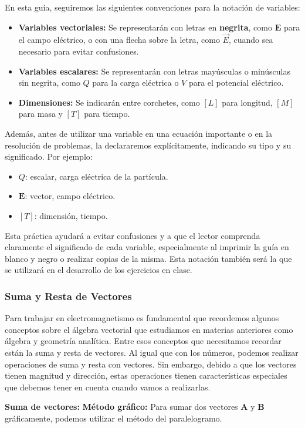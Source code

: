 \documentclass{article}
\begin{document}
En esta guía, seguiremos las siguientes convenciones para la notación de variables:
\begin{itemize}
\item[\textbullet] \textbf{Variables vectoriales:} Se representarán con letras en \textbf{negrita}, como $\mathbf{E}$ para el campo eléctrico, o con una flecha sobre la letra, como $\vec{E}$, cuando sea necesario para evitar confusiones.
\item[\textbullet] \textbf{Variables escalares:} Se representarán con letras mayúsculas o minúsculas sin negrita, como $Q$ para la carga eléctrica o $V$ para el potencial eléctrico.
\item[\textbullet] \textbf{Dimensiones:} Se indicarán entre corchetes, como $[L]$ para longitud, $[M]$ para masa y $[T]$ para tiempo.
\end{itemize}
Además, antes de utilizar una variable en una ecuación importante o en la resolución de problemas, la declararemos explícitamente, indicando su tipo y su significado. Por ejemplo:
\begin{itemize}
\item[\textbullet] $Q$: escalar, carga eléctrica de la partícula.
\item[\textbullet] $\mathbf{E}$: vector, campo eléctrico.
\item[\textbullet] $[T]$: dimensión, tiempo.
\end{itemize}
Esta práctica ayudará a evitar confusiones y a que el lector comprenda claramente el significado de cada variable, especialmente al imprimir la guía en blanco y negro o realizar copias de la misma. Esta notación también será la que se utilizará en el desarrollo de los ejercicios en clase.

\subsubsection{Suma y Resta de Vectores}
Para trabajar en electromagnetismo es fundamental que recordemos algunos conceptos sobre el álgebra vectorial que estudiamos en materias anteriores como álgebra y geometría analítica. Entre esos conceptos que necesitamos recordar están la suma y resta de vectores. Al igual que con los números, podemos realizar operaciones de suma y resta con vectores. Sin embargo, debido a que los vectores tienen magnitud y dirección, estas operaciones tienen características especiales que debemos tener en cuenta cuando vamos a realizarlas.

\textbf{Suma de vectores:}
\textbf{Método gráfico:} Para sumar dos vectores $\mathbf{A}$ y $\mathbf{B}$ gráficamente, podemos utilizar el método del paralelogramo.
\end{document}
